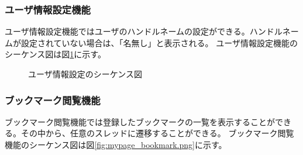 \documentclass[a4j]{jarticle}
\begin{document}
  \subsubsection{ユーザ情報設定機能}
  ユーザ情報設定機能ではユーザのハンドルネームの設定ができる。ハンドルネームが設定されていない場合は、「名無し」と表示される。
  ユーザ情報設定機能のシーケンス図は図\ref{fig:mypage_user.png}に示す。
  \begin{figure}[H]
    \centering
    \caption{ユーザ情報設定のシーケンス図}
    \label{fig:mypage_user.png}
  \end{figure}


  \subsubsection{ブックマーク閲覧機能}
  ブックマーク閲覧機能では登録したブックマークの一覧を表示することができる。その中から、任意のスレッドに遷移することができる。
  ブックマーク閲覧機能のシーケンス図は図\ref{fig:mypage_bookmark.png}に示す。
\end{document}
